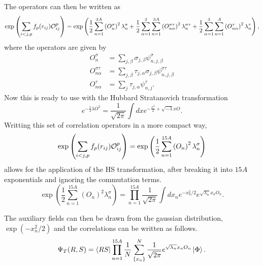 The operators can then be written as
\begin{equation}
   \exp\left(\sum\limits_{i<j,p}f_p(r_{ij})\mathcal{O}^p_{ij}\right) = \exp\left(\frac{1}{2}\sum\limits_{n=1}^{3A} \left(O_{n}^{\sigma}\right)^2 \lambda_n^{\sigma}
      + \frac{1}{2}\sum\limits_{\alpha=1}^{3}\sum\limits_{n=1}^{3A} \left(O_{n\alpha}^{\sigma\tau}\right)^2 \lambda_n^{\sigma\tau}
      + \frac{1}{2}\sum\limits_{\alpha=1}^{3}\sum\limits_{n=1}^{A} \left(O_{n\alpha}^{\tau}\right)^2 \lambda_n^{\tau}\right),
\end{equation}
where the operators are given by
\begin{equation}
\begin{split}
   O_{n}^{\sigma} &= \sum\limits_{j,\beta} \sigma_{j,\beta}\psi_{n,j,\beta}^{\sigma} \\
   O_{n\alpha}^{\sigma\tau} &= \sum\limits_{j,\beta} \tau_{j,\alpha}\sigma_{j,\beta}\psi_{n,j,\beta}^{\sigma\tau} \\
   O_{n\alpha}^{\tau} &= \sum\limits_{j} \tau_{j,\alpha}\psi_{n,j}^{\tau}.
\end{split}
\end{equation}
Now this is ready to use with the Hubbard Stratanovich transformation
\begin{equation}
   e^{-\frac{1}{2}\lambda O^2} = \frac{1}{\sqrt{2\pi}} \int dx e^{-\frac{x^2}{2} + \sqrt{-\lambda}x O}.
\end{equation}
Writting this set of correlation operators in a more compact way,
\begin{equation}
    \exp\left(\sum\limits_{i<j,p}f_p(r_{ij})\mathcal{O}^p_{ij}\right) = \exp\left(\frac{1}{2}\sum\limits_{n=1}^{15A} \left(O_{n}\right)^2 \lambda_n^{\sigma}\right)
\end{equation}
allows for the application of the HS transformation, after breaking it into $15A$ exponentials and ignoring the commutation terms.
\begin{equation}
   \exp\left(\frac{1}{2}\sum\limits_{n=1}^{15A} \left(O_{n}\right)^2 \lambda_n^{\sigma}\right) = \prod\limits_{n=1}^{15A} \frac{1}{\sqrt{2\pi}}\int dx_n e^{-x_n^2/2}e^{\sqrt{\lambda_n}x_nO_n}.
\end{equation}

The auxiliary fields can then be drawn from the gaussian distribution, $\exp\left(-x_n^2/2\right)$ and the correlations can be written as follows.
\begin{equation}
   \Psi_T(R,S) = \left< RS \right|\prod\limits_{n=1}^{15A} \frac{1}{N} \sum\limits_{\{x_n\}}^N\frac{1}{\sqrt{2\pi}}e^{\sqrt{\lambda_n}x_nO_n}\left| \Phi \right>.
\end{equation}

